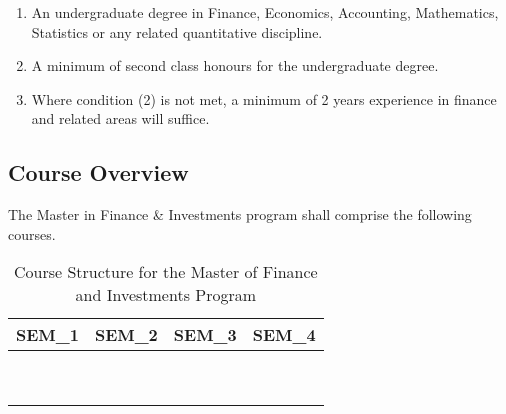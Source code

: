 \documentclass[16,a4paperpaper,]{article}
\begin{document}
\begin{enumerate}
\def\labelenumi{\arabic{enumi}.}
\item
  An undergraduate degree in Finance, Economics, Accounting,
  Mathematics, Statistics or any related quantitative discipline.
\item
  A minimum of second class honours for the undergraduate degree.
\item
  Where condition (2) is not met, a minimum of 2 years experience in
  finance and related areas will suffice.
\end{enumerate}

\subsection{Course Overview}

The Master in Finance \& Investments program shall comprise the
following courses.

\begin{table}[!h]

\caption{\label{tab:unnamed-chunk-1}Course Structure for the Master of Finance and Investments Program}
\centering
\begin{tabu} to 
\toprule
SEM\_1 & SEM\_2 & SEM\_3 & SEM\_4\\
\midrule
{} &  &  & \\
 &  &  \vphantom{3} & \\
 &  &  & \\
 &  &  \vphantom{2} & \\
 &  &  & \\
\addlinespace
 &  &  \vphantom{1} & \\
 &  &  & \\
 &  &  & \\
 &  &  & \\
\bottomrule
\end{tabu}
\end{table}
\end{document}
